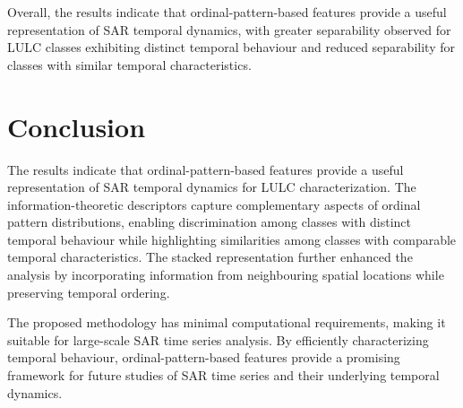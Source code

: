 \documentclass[
  conference]{IEEEtran}
\begin{document}
\begin{table}

\caption{\label{tbl-svm-class-performance}SVM classification performance metrics}


\end{table}%

Overall, the results indicate that ordinal-pattern-based features
provide a useful representation of SAR temporal dynamics, with greater
separability observed for LULC classes exhibiting distinct temporal
behaviour and reduced separability for classes with similar temporal
characteristics.

\section{Conclusion}\label{conclusion}

The results indicate that ordinal-pattern-based features provide a
useful representation of SAR temporal dynamics for LULC
characterization. The information-theoretic descriptors capture
complementary aspects of ordinal pattern distributions, enabling
discrimination among classes with distinct temporal behaviour while
highlighting similarities among classes with comparable temporal
characteristics. The stacked representation further enhanced the
analysis by incorporating information from neighbouring spatial
locations while preserving temporal ordering.

The proposed methodology has minimal computational requirements, making
it suitable for large-scale SAR time series analysis. By efficiently
characterizing temporal behaviour, ordinal-pattern-based features
provide a promising framework for future studies of SAR time series and
their underlying temporal dynamics.
\end{document}
